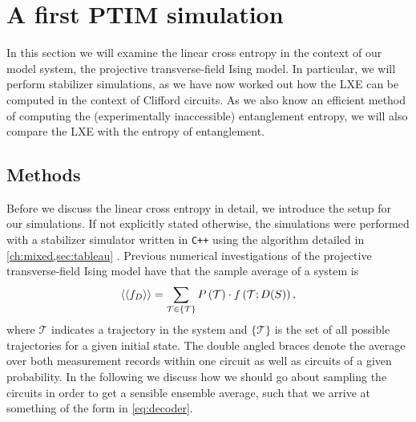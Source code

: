 \section{A first PTIM simulation}

In this section we will examine the linear cross entropy in the context of our
model system, the projective transverse-field Ising model. In particular, we
will perform stabilizer simulations, as we have now
worked out how the LXE can be computed in the context of Clifford circuits. As we
also know an efficient method of computing the (experimentally inaccessible)
entanglement entropy, we will also compare the LXE with the entropy of
entanglement.
\subsection{Methods}\label{sec:lxe-numeric}
Before we discuss the linear cross entropy in detail, we introduce the setup
for our simulations. If not explicitly stated otherwise, the simulations were
performed with a stabilizer simulator written in \verb|C++| using the algorithm detailed in
\cref{ch:mixed,sec:tableau} \cite{langCliffordCircuitSimulator2022}.
Previous numerical investigations of the projective transverse-field Ising
model have that the sample average of a system is
\cite{roserDecodingProjectiveTransverse2023}
\begin{align}\label{eq:decoder}
      \expval{\expval{f_D}} = \sum_{\mathcal{T} \in \{
    \mathcal{T} \} } P\left(\mathcal{T}\right) \cdot
    f\left(\mathcal{T} ; D(S)\right)
,\end{align}
where $\mathcal{T}$ indicates a trajectory in the system and
$\{ \mathcal{T} \}$ is the set of all possible trajectories for a given
initial state. The double angled braces 
denote the average over both measurement records within one circuit as well as
circuits of a given probability. In the following we discuss how we should go
about sampling the circuits in order to get a sensible ensemble average, such
that we arrive at something of the form in \cref{eq:decoder}.

